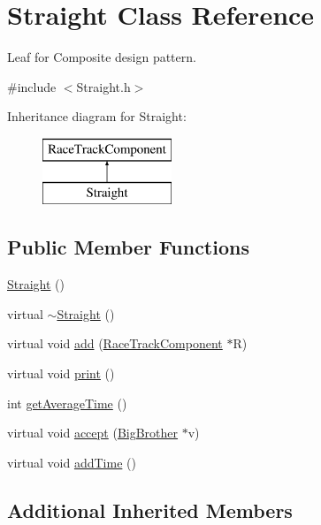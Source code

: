 \hypertarget{class_straight}{}\section{Straight Class Reference}
\label{class_straight}


Leaf for Composite design pattern.  




{\ttfamily \#include $<$Straight.\+h$>$}

Inheritance diagram for Straight\+:\begin{figure}[H]
\begin{center}
\leavevmode
\includegraphics[height=2.000000cm]{class_straight}
\end{center}
\end{figure}
\subsection*{Public Member Functions}
\begin{DoxyCompactItemize}
\item 
\mbox{\hyperlink{class_straight_a4a1633c9f829c817c9b598ec4dd835b0}{Straight}} ()
\item 
virtual \mbox{\hyperlink{class_straight_ac0b30476ec27b8a8eeb20f3d1ef0dc13}{$\sim$\+Straight}} ()
\item 
virtual void \mbox{\hyperlink{class_straight_a31040b9493c960757e83a2a239865950}{add}} (\mbox{\hyperlink{class_race_track_component}{Race\+Track\+Component}} $\ast$R)
\item 
virtual void \mbox{\hyperlink{class_straight_ae95d3bdc1d16c97c8d6a6ab60e3205e4}{print}} ()
\item 
int \mbox{\hyperlink{class_straight_ae8851ae19372aeaa8a61b17114c78754}{get\+Average\+Time}} ()
\item 
virtual void \mbox{\hyperlink{class_straight_a8f71b6f1bcf39a5aa79efdfe0c432d1e}{accept}} (\mbox{\hyperlink{class_big_brother}{Big\+Brother}} $\ast$v)
\item 
virtual void \mbox{\hyperlink{class_straight_ac73d5c8287446875ad28835f2d72a802}{add\+Time}} ()
\end{DoxyCompactItemize}
\subsection*{Additional Inherited Members}


